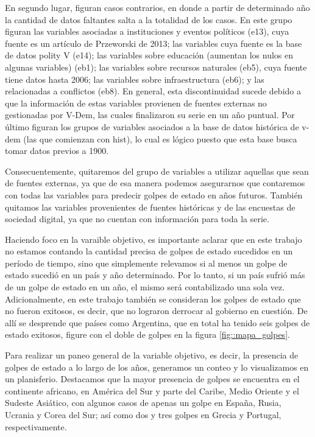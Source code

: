 \documentclass{article}
\begin{document}
En segundo lugar, figuran casos contrarios, en donde a partir de determinado año
la cantidad de datos faltantes salta a la totalidad de los casos. En este grupo
figuran las variables asociadas a instituciones y eventos políticos (e13), cuya 
fuente es un artículo de Przeworski de 2013; las variables cuya fuente es la base
de datos polity V (e14); las variables sobre educación (aumentan los nulos en 
algunas variables) (eb1); las variables sobre recursos naturales (eb5), cuya fuente 
tiene datos hasta 2006; las variables sobre infraestructura (eb6); y las relacionadas 
a conflictos (eb8). En general, esta discontinuidad sucede debido a que la 
información de estas variables provienen de fuentes externas no gestionadas por 
V-Dem, las cuales finalizaron su serie en un año puntual. Por último figuran los 
grupos de variables asociados a la base de datos histórica de v-dem (las que comienzan 
con hist), lo cual es lógico puesto que esta base busca tomar datos previos a 1900.

Consecuentemente, quitaremos del grupo de variables a utilizar aquellas que sean de
fuentes externas, ya que de esa manera podemos asegurarnos que contaremos con todas
las variables para predecir golpes de estado en años futuros. También quitamos las
variables provenientes de fuentes históricas y de las encuestas de sociedad digital,
ya que no cuentan con información para toda la serie.

Haciendo foco en la varaible objetivo, es importante aclarar que en este trabajo no 
estamos contando la cantidad precisa
de golpes de estado sucedidos en un período de tiempo, sino que simplemente relevamos
si al menos un golpe de estado sucedió en un país y año determinado. Por lo tanto, si
un país sufrió más de un golpe de estado en un año, el mismo será contabilizado una
sola vez. Adicionalmente, en este trabajo también se consideran los golpes de estado
que no fueron exitosos, es decir, que no lograron derrocar al gobierno en cuestión. 
De allí se desprende que países como Argentina, que en total ha tenido seis golpes de 
estado exitosos, figure con el doble de golpes en la figura \ref{fig::mapa_golpes}.

Para realizar un paneo general de la variable objetivo, es decir, la presencia de
golpes de estado a lo largo de los años, generamos un conteo y lo visualizamos en un 
planisferio. Destacamos que la mayor presencia de golpes se encuentra en el 
continente africano, en América del Sur y parte del Caribe, Medio Oriente y el 
Sudeste Asiático, con algunos casos de apenas un golpe en España, Rusia, Ucrania 
y Corea del Sur; así como dos y tres golpes en Grecia y Portugal, respectivamente.
\end{document}
